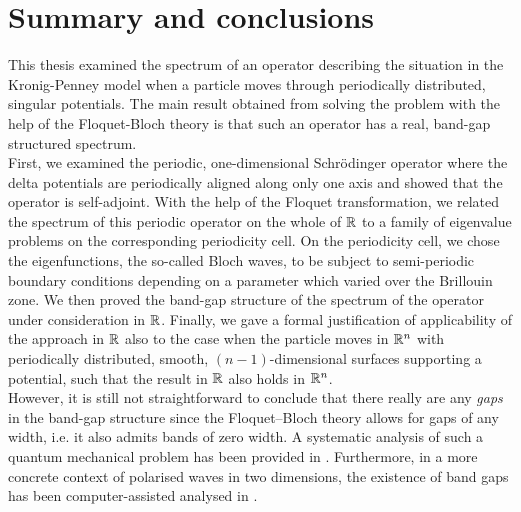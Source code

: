 \chapter{Summary and conclusions} \label{chap:8}
	
This thesis examined the spectrum of an operator describing the situation in the Kronig-Penney model when a particle moves through periodically distributed, singular potentials. The main result obtained from solving the problem with the help of the Floquet-Bloch theory is that such an operator has a real, band-gap structured spectrum.
~\\

First, we examined the periodic, one-dimensional Schrödinger operator where the delta potentials are periodically aligned along only one axis and showed that the operator is self-adjoint. With the help of the Floquet transformation, we related the spectrum of this periodic operator on the whole of $\mathbb{R}$ to a family of eigenvalue problems on the corresponding periodicity cell. On the periodicity cell, we chose the eigenfunctions, the so-called Bloch waves, to be subject to semi-periodic boundary conditions depending on a parameter which varied over the Brillouin zone. We then proved the band-gap structure of the spectrum of the operator under consideration in $\mathbb{R}$. Finally, we gave a formal justification of applicability of the approach in $\mathbb{R}$ also to the case when the particle moves in $\mathbb{R}^{n}$ with periodically distributed, smooth, $(n-1)$-dimensional surfaces supporting a potential, such that the result in $\mathbb{R}$ also holds in $\mathbb{R}^{n}$. 
~\\

However, it is still not straightforward to conclude that there really are any \textit{gaps} in the band-gap structure since the Floquet–Bloch theory allows for gaps of any width, i.e. it also admits bands of zero width. A systematic analysis of such a quantum mechanical problem has been provided in \cite{albeverio2012solvable}. Furthermore, in a more concrete context of polarised waves in two dimensions, the existence of band gaps has been computer-assisted analysed in \cite{hoang2009computer}. 
~\\

